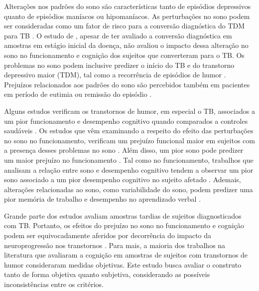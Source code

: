 \documentclass[chapter=TITLE,
               oneside,
               12pt,
               a4paper,
               english,
               brazil]{abntex2}    %
\begin{document}
    Alterações nos padrões do sono são características tanto de episódios depressivos
    quanto de episódios maníacos ou hipomaníacos.
    As perturbações no sono podem ser consideradas como um fator de risco para a
    conversão diagnóstica do TDM para TB
    \parencite{ritter_disturbed_2015}.
    O estudo de \textcite{ritter_disrtubed_2015}, apesar de ter avaliado a conversão
    diagnóstica em amostras em estágio inicial da doença, não avaliou o impacto dessa
    alteração no sono no funcionamento e cognição dos sujeitos que converteram para o
    TB.
    Os problemas no sono podem inclusive predizer o início do TB e do transtorno
    depressivo maior (TDM), tal como a recorrência de episódios de humor
    \parencite{melo_sleep_2016,
    kaplan_sleep_2020,
    andrade-gonzalez_initial_2020}.
    Prejuízos relacionados aos padrões do sono são percebidos também em pacientes
    em período de eutimia ou remissão do episódio
    \parencite{de_la_fuente-tomas_sleep_2018}.

    Alguns estudos verificam os transtornos de humor, em especial o TB, associados
    a um pior funcionamento e desempenho cognitivo quando comparados a controles
    saudáveis
    \parencite{reyes_functional_2017,
    kapczinski_cognition_2016}.
    Os estudos que vêm examinando a respeito do efeito das perturbações no
    sono no funcionamento, verificam um prejuízo funcional maior em sujeitos
    com a presença desses problemas no sono
    \parencite{lai_familiality_2014}.
    Além disso, um pior sono pode
    predizer um maior prejuízo no funcionamento
    \parencite{walz_daytime_2013,
    slyepchenko_association_2019}.
    Tal como no funcionamento, trabalhos que analisam a relação entre
    sono e desempenho cognitivo tendem a observar um pior sono associado
    a um pior desempenho cognitivo no sujeito afetado
    \parencite{russo_relationship_2015,
    kaplan_sleep_2020}.
    Ademais, alterações relacionadas ao sono, como variabilidade do sono,
    podem predizer uma pior memória de trabalho e desempenho no aprendizado
    verbal
    \parencite{kanady_association_2017}.

    Grande parte dos estudos avaliam amostras tardias de sujeitos diagnosticados
    com TB.
    Portanto, os efeitos do prejuízo no sono no funcionamento e cognição podem
    ser equivocadamente aferidos por decorrência do impacto da neuroprogressão
    nos transtornos
    \parencite{tohen_two-year_2000}.
    Para mais, a maioria dos trabalhos na literatura que avaliaram a cognição
    em amostras de sujeitos com transtornos de humor consideraram medidas
    objetivas. Este estudo busca avaliar o construto tanto de forma objetiva
    quanto subjetiva, considerando as possíveis inconsistências entre os critérios.
    
\end{document}
